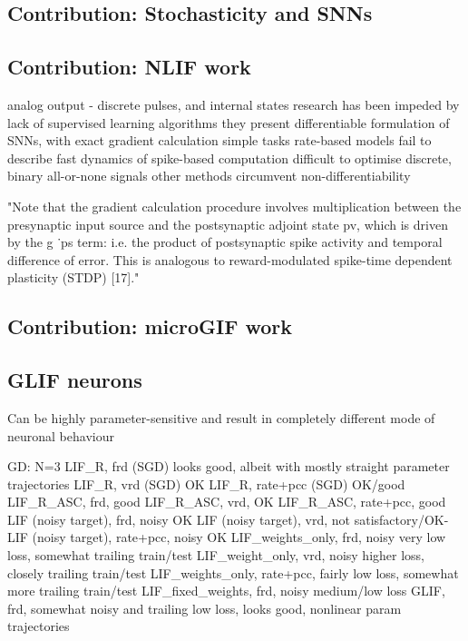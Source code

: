 \documentclass[mphil,deptreport,ai]{infthesis} %
\begin{document}
\subsection{Contribution: Stochasticity and SNNs}

\subsection{Contribution: NLIF work}

analog output - discrete pulses, and internal states
research has been impeded by lack of supervised learning algorithms
they present differentiable formulation of SNNs, with exact gradient calculation
simple tasks
rate-based models fail to describe fast dynamics of spike-based computation
difficult to optimise discrete, binary all-or-none signals
other methods circumvent non-differentiability

"Note that the gradient calculation procedure involves multiplication between the presynaptic input source and the postsynaptic adjoint state pv, which is driven by the g ˙ps term: i.e. the product of postsynaptic spike activity and temporal difference of error. This is analogous to reward-modulated spike-time dependent plasticity (STDP) [17]."

\subsection{Contribution: microGIF work}

\subsection{GLIF neurons}

Can be highly parameter-sensitive and result in completely different mode of neuronal behaviour

GD: 
N=3
LIF\_R, frd (SGD) looks good, albeit with mostly straight parameter trajectories
LIF\_R, vrd (SGD) OK
LIF\_R, rate+pcc (SGD) OK/good
LIF\_R\_ASC, frd, good
LIF\_R\_ASC, vrd, OK
LIF\_R\_ASC, rate+pcc, good
LIF (noisy target), frd, noisy OK
LIF (noisy target), vrd, not satisfactory/OK-
LIF (noisy target), rate+pcc, noisy OK
LIF\_weights\_only, frd, noisy very low loss, somewhat trailing train/test
LIF\_weight\_only, vrd, noisy higher loss, closely trailing train/test
LIF\_weights\_only, rate+pcc, fairly low loss, somewhat more trailing train/test
LIF\_fixed\_weights, frd, noisy medium/low loss
GLIF, frd, somewhat noisy and trailing low loss, looks good, nonlinear param trajectories
\end{document}
